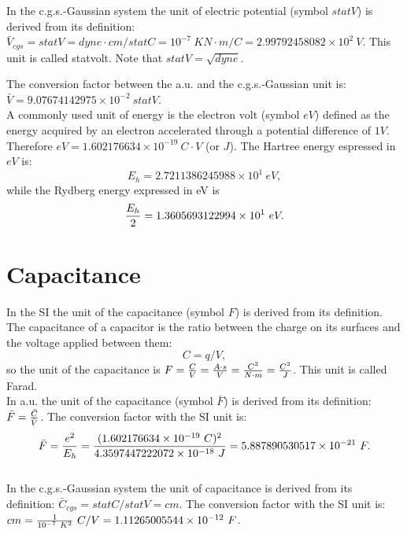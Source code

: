 \documentclass[12pt,a4paper]{article}
\def\e{1.602176634\times 10^{-19}}
\def\baru{4.3597447222072\times 10^{-18}}
\def\barc{1.602176634\times 10^{-19}}
\def\barphi{2.7211386245988\times 10^{1}}
\def\barcap{5.887890530517\times 10^{-21}}
\def\phitophi{2.99792458082\times 10^{2}}
\def\captocap{1.11265005544\times 10^{-12}}
\def\barphicgs{9.07674142975\times 10^{-2}}
\def\ryev{1.3605693122994\times 10^{1}}
\begin{document}
{\color{orange} In the c.g.s.-Gaussian system the unit of electric potential
(symbol $statV$) is derived from its definition: 
$\bar V_{cgs}=statV=dyne\cdot cm / statC = {10^{-7}\ K} 
N\cdot m/C=\phitophi\ V$. This unit
is called statvolt. Note that 
$statV=\sqrt{dyne}$.
\\
}

{\color{green} 
The conversion factor between the a.u. and the c.g.s.-Gaussian unit
is:
$\bar V = \barphicgs \ statV$.
}
\\

{\color{red} A commonly used unit of energy is the electron volt (symbol $eV$)
defined as the energy acquired by an electron accelerated through a
potential difference of $1 V$. Therefore $eV=\e\ C\cdot V$ (or $J$).
The Hartree energy espressed in $eV$ is: 
\begin{equation}
E_h=\barphi\ eV,
\end{equation}
while the Rydberg energy expressed in eV is
\begin{equation}
{E_h \over 2}=\ryev\ eV.
\end{equation}
}

\newpage
\section{\color{coral}Capacitance}
In the SI the unit of the capacitance (symbol $F$) is derived from its 
definition. The capacitance of a capacitor is the ratio between the charge
on its surfaces and the voltage applied between them:
\begin{equation}
C=q/V,
\end{equation}
so the unit of the capacitance is $F={C \over V}={A \cdot s \over V}=
{C^2 \over N \cdot m}
={C^2 \over J}$. This unit is called Farad.
\\

{\color{web-blue} In a.u. the unit of the capacitance (symbol $\bar F$) 
is derived from its definition: $\bar F={\bar C \over \bar V}$. The 
conversion factor with the SI unit is:
\begin{equation}
\bar F = {e^2 \over E_h} = {(\barc\ C)^2\over \baru\ J}=\barcap\ F.
\end{equation}
}
\\

{\color{orange} In the c.g.s.-Gaussian system the unit of capacitance
is derived from its definition: $\bar C_{cgs}=statC/statV=cm$. The 
conversion factor with the SI unit is:
$cm={1\over 10^{-7}\ K^2}\ C/V=\captocap\ F$.
}
\\
\end{document}
